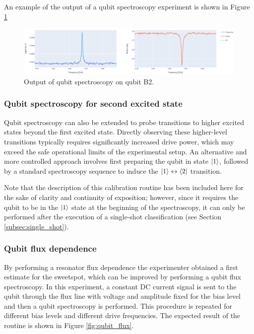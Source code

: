 An example of the output of a qubit spectroscopy experiment is shown in Figure \ref{fig:qubit_spectroscopy}
\begin{figure}[h!]
    \centering
    \includegraphics[width=\textwidth]{figures/png/qubit_spectroscopy.png}
    \caption{Output of qubit spectroscopy on qubit B2.}
    \label{fig:qubit_spectroscopy}
\end{figure}

\subsubsection{Qubit spectroscopy for second excited state}
Qubit spectroscopy can also be extended to probe transitions to higher excited states beyond the first excited state. 
Directly observing these higher-level transitions typically requires significantly increased drive power, which may exceed the safe operational limits of the experimental setup. 
An alternative and more controlled approach involves first preparing the qubit in state $\ket{1}$, followed by a standard spectroscopy sequence to induce the $\ket{1} \leftrightarrow \bra{2}$ transition. 


Note that the description of this calibration routine has been included here for the sake of clarity and continuity of exposition; however, since it requires the qubit to be in the $\ket{1}$ state at the beginning of the spectroscopy, it can only be performed after the execution of a single-shot classification (see Section \ref{subsec:single_shot}).

\subsubsection{Qubit flux dependence}
By performing a resonator flux dependence the experimenter obtained a first estimate for the sweetspot, which can be improved by performing a qubit flux spectroscopy.
In this experiment, a constant DC current signal is sent to the qubit through the flux line with voltage and amplitude fixed for the bias level and then a qubit spectroscopy is performed.
This procedure is repeated for different bias levels and different drive frequencies.
The expected result of the routine is shown in Figure \ref{fig:qubit_flux}.

